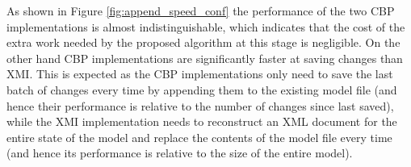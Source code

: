 \documentclass{llncs}
\begin{document}
As shown in Figure \ref{fig:append_speed_conf} the performance of the two CBP implementations is almost indistinguishable, which indicates that the cost of the extra work needed by the proposed algorithm at this stage is negligible. On the other hand CBP implementations are significantly faster at saving changes than XMI. This is expected as the CBP implementations only need to save the last batch of changes every time by appending them to the existing model file (and hence their performance is relative to the number of changes since last saved), while the XMI implementation needs to reconstruct an XML document for the entire state of the model and replace the contents of the model file every time (and hence its performance is relative to the size of the entire model). 


\end{document}
